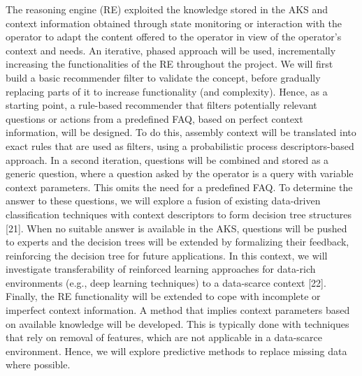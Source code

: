 The reasoning engine (RE) exploited the knowledge stored in the AKS and context information obtained through state monitoring or interaction with the operator to adapt the content offered to the operator in view of the operator's context and needs. 
An iterative, phased approach will be used, incrementally increasing the functionalities of the RE throughout the project. 
We will first build a basic recommender filter to validate the concept, before gradually replacing parts of it to increase functionality (and complexity). Hence, as a starting point, a rule-based recommender that filters potentially relevant questions or actions from a predefined FAQ, based on perfect context information, will be designed. To do this, assembly context will be translated into exact rules that are used as filters, using a probabilistic process descriptors-based approach. 
In a second iteration, questions will be combined and stored as a generic question, where a question asked by the operator is a query with variable context parameters. This omits the need for a predefined FAQ. To determine the answer to these questions, we will explore a fusion of existing data-driven classification techniques with context descriptors to form decision tree structures [21]. When no suitable answer is available in the AKS, questions will be pushed to experts and the decision trees will be extended by formalizing their feedback, reinforcing the decision tree for future applications.
In this context, we will investigate transferability of reinforced learning approaches for data-rich environments (e.g., deep learning techniques) to a data-scarce context [22]. Finally, the RE functionality will be extended to cope with incomplete or imperfect context information. A method that implies context parameters based on available knowledge will be developed. This is typically done with techniques that rely on removal of features, which are not applicable in a data-scarce environment. Hence, we will explore predictive methods to replace missing data where possible.
